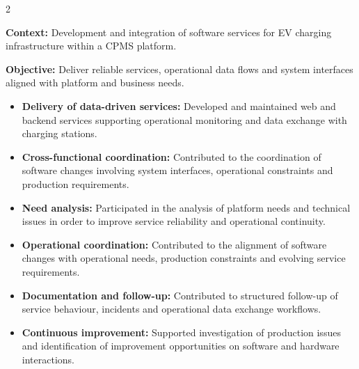 \documentclass[8pt,a4paper,ragged2e,withhyper]{altacv}
\begin{document}


\makecvheader

\vspace{-0.3cm}


\begin{paracol}{2}


\textbf{Context:} Development and integration of software services for EV charging infrastructure within a CPMS platform.

\textbf{Objective:} Deliver reliable services, operational data flows and system interfaces aligned with platform and business needs.

\begin{itemize}
\item \textbf{Delivery of data-driven services:} Developed and maintained web and backend services supporting operational monitoring and data exchange with charging stations.
\item \textbf{Cross-functional coordination:} Contributed to the coordination of software changes involving system interfaces, operational constraints and production requirements.
\item \textbf{Need analysis:} Participated in the analysis of platform needs and technical issues in order to improve service reliability and operational continuity.
\item \textbf{Operational coordination:} Contributed to the alignment of software changes with operational needs, production constraints and evolving service requirements.
\item \textbf{Documentation and follow-up:} Contributed to structured follow-up of service behaviour, incidents and operational data exchange workflows.
\item \textbf{Continuous improvement:} Supported investigation of production issues and identification of improvement opportunities on software and hardware interactions.
\end{itemize}


\end{paracol}
\end{document}
